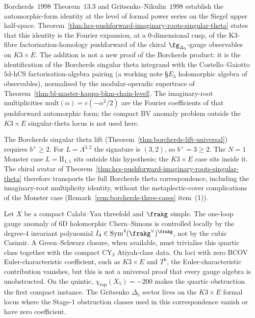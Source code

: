 \begin{remark}
\label{rem:chiral-avatar-adds-to-borcherds}
Borcherds~$1998$ Theorem~$13.3$ and Gritsenko--Nikulin~$1998$ establish the automorphic-form identity at the level of formal power series on the Siegel upper half-space. Theorem~\ref{thm:hcs-pushforward-imaginary-roots-singular-theta} states that this identity is the Fourier expansion, at a $0$-dimensional cusp, of the K3-fibre factorisation-homology pushforward of the chiral $\fg_{\Delta_5}$-gauge observables on $K3 \times E$. The addition is not a new proof of the Borcherds product: it is the identification of the Borcherds singular theta integrand with the Costello--Gaiotto $5\mathrm{d}$-hCS factorisation-algebra pairing (a working note \S $E_3$ holomorphic algebra of observables), normalised by the modular-operadic supertrace of Theorem~\ref{thm:bl-master-kappa-bkm-chain-level}. The imaginary-root multiplicities $\mathrm{mult}(\alpha) = c(-\alpha^2/2)$ are the Fourier coefficients of that pushforward automorphic form; the compact BV anomaly problem outside the $K3\times E$ singular-theta locus is not used here.
\end{remark}

\begin{remark}
\label{rem:bplus-geq-two-k3e}
The Borcherds singular theta lift \textup{(}Theorem~\ref{thm:borcherds-lift-universal}\textup{)} requires $b^+ \geq 2$. For $L = \Lambda^{3,2}$ the signature is $(3, 2)$, so $b^+ = 3 \geq 2$. The $N = 1$ Monster case $L = \mathrm{II}_{1,1}$ sits outside this hypothesis; the $K3 \times E$ case sits inside it. The chiral avatar of Theorem~\ref{thm:hcs-pushforward-imaginary-roots-singular-theta} therefore transports the full Borcherds theta correspondence, including the imaginary-root multiplicity identity, without the metaplectic-cover complications of the Monster case \textup{(}Remark~\ref{rem:borcherds-three-cases} item~\textup{(1)}\textup{)}.
\end{remark}

\begin{conjecture}
\label{conj:quintic-hcs-kanom}
\ClaimStatusConjectured
Let $X$ be a compact Calabi--Yau threefold and $\frakg$ simple. The
one-loop gauge anomaly of 6D holomorphic Chern--Simons is controlled
locally by the degree-$4$ invariant polynomial
$I_4\in\mathrm{Sym}^4(\frakg^\vee)^{\frakg}$, not by the cubic Casimir.
A Green--Schwarz closure, when available, must trivialise this quartic
class together with the compact CY$_3$ Atiyah-class data. On loci with
zero BCOV Euler-characteristic coefficient, such as $K3\times E$ and
$T^6$, the Euler-characteristic contribution vanishes, but this is not a
universal proof that every gauge algebra is unobstructed. On the
quintic, $\chi_{\mathrm{top}}(X_5)=-200$ makes the quartic obstruction
the first compact instance. The Gritsenko $\Delta_5$ sector lives on
the $K3\times E$ formal locus where the Stage-$1$ obstruction classes
used in this correspondence vanish or have zero coefficient.
\end{conjecture}


